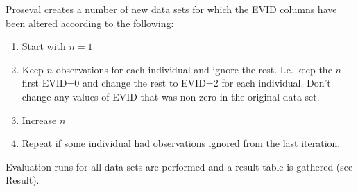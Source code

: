 Proseval creates a number of new data sets for which the EVID columns have been altered according to the following:

\begin{enumerate}
    \item Start with $n=1$
    \item Keep $n$ observations for each individual and ignore the rest. I.e. keep the $n$ first EVID=0 and change the rest to EVID=2 for each individual. Don't change any values of EVID that was non-zero in the original data set.
    \item Increase $n$
    \item Repeat if some individual had observations ignored from the last iteration.
\end{enumerate}

Evaluation runs for all data sets are performed and a result table is gathered (see Result).



